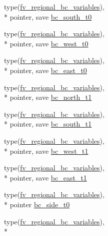 \begin{DoxyCompactItemize}
\item 
type(\hyperlink{structfv__regional__mod_1_1fv__regional__bc__variables}{fv\-\_\-regional\-\_\-bc\-\_\-variables}), \\*
pointer, save \hyperlink{classfv__regional__mod_a8868f1a8567b94835e8c8d4a86c245c0}{bc\-\_\-south\-\_\-t0}
\item 
type(\hyperlink{structfv__regional__mod_1_1fv__regional__bc__variables}{fv\-\_\-regional\-\_\-bc\-\_\-variables}), \\*
pointer, save \hyperlink{classfv__regional__mod_aad83e1ac00233cc47374f4b3cf630a1d}{bc\-\_\-west\-\_\-t0}
\item 
type(\hyperlink{structfv__regional__mod_1_1fv__regional__bc__variables}{fv\-\_\-regional\-\_\-bc\-\_\-variables}), \\*
pointer, save \hyperlink{classfv__regional__mod_a9a63cc3ebf0fab65d4d6c362ae03b475}{bc\-\_\-east\-\_\-t0}
\item 
type(\hyperlink{structfv__regional__mod_1_1fv__regional__bc__variables}{fv\-\_\-regional\-\_\-bc\-\_\-variables}), \\*
pointer, save \hyperlink{classfv__regional__mod_a01fce45b2f3c2a2e3ba5005abb72670b}{bc\-\_\-north\-\_\-t1}
\item 
type(\hyperlink{structfv__regional__mod_1_1fv__regional__bc__variables}{fv\-\_\-regional\-\_\-bc\-\_\-variables}), \\*
pointer, save \hyperlink{classfv__regional__mod_af6125f39e9a9ed769e9cd2a17a8d3c99}{bc\-\_\-south\-\_\-t1}
\item 
type(\hyperlink{structfv__regional__mod_1_1fv__regional__bc__variables}{fv\-\_\-regional\-\_\-bc\-\_\-variables}), \\*
pointer, save \hyperlink{classfv__regional__mod_aa8aceea599c16392ae3ebc4b65668992}{bc\-\_\-west\-\_\-t1}
\item 
type(\hyperlink{structfv__regional__mod_1_1fv__regional__bc__variables}{fv\-\_\-regional\-\_\-bc\-\_\-variables}), \\*
pointer, save \hyperlink{classfv__regional__mod_affeac28c243080f92d93528428b53075}{bc\-\_\-east\-\_\-t1}
\item 
type(\hyperlink{structfv__regional__mod_1_1fv__regional__bc__variables}{fv\-\_\-regional\-\_\-bc\-\_\-variables}), \\*
pointer \hyperlink{classfv__regional__mod_a152d9905d14d20d277c4fddf7a5fbc52}{bc\-\_\-side\-\_\-t0}
\item 
type(\hyperlink{structfv__regional__mod_1_1fv__regional__bc__variables}{fv\-\_\-regional\-\_\-bc\-\_\-variables}), \\*

\end{DoxyCompactItemize}
